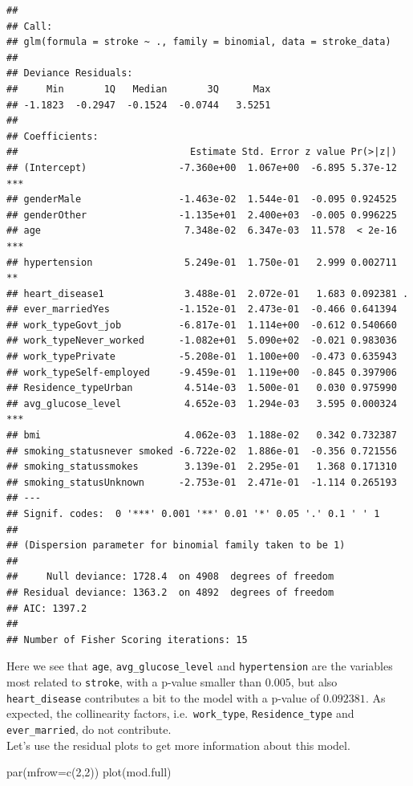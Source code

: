 \documentclass[
]{article}
\newenvironment{Shaded}{\begin{snugshade}}{\end{snugshade}}
\newcommand{\AttributeTok}[1]{\textcolor[rgb]{0.77,0.63,0.00}{#1}}
\newcommand{\DecValTok}[1]{\textcolor[rgb]{0.00,0.00,0.81}{#1}}
\newcommand{\FunctionTok}[1]{\textcolor[rgb]{0.00,0.00,0.00}{#1}}
\newcommand{\NormalTok}[1]{#1}
\begin{document}
\begin{verbatim}
## 
## Call:
## glm(formula = stroke ~ ., family = binomial, data = stroke_data)
## 
## Deviance Residuals: 
##     Min       1Q   Median       3Q      Max  
## -1.1823  -0.2947  -0.1524  -0.0744   3.5251  
## 
## Coefficients:
##                              Estimate Std. Error z value Pr(>|z|)    
## (Intercept)                -7.360e+00  1.067e+00  -6.895 5.37e-12 ***
## genderMale                 -1.463e-02  1.544e-01  -0.095 0.924525    
## genderOther                -1.135e+01  2.400e+03  -0.005 0.996225    
## age                         7.348e-02  6.347e-03  11.578  < 2e-16 ***
## hypertension                5.249e-01  1.750e-01   2.999 0.002711 ** 
## heart_disease1              3.488e-01  2.072e-01   1.683 0.092381 .  
## ever_marriedYes            -1.152e-01  2.473e-01  -0.466 0.641394    
## work_typeGovt_job          -6.817e-01  1.114e+00  -0.612 0.540660    
## work_typeNever_worked      -1.082e+01  5.090e+02  -0.021 0.983036    
## work_typePrivate           -5.208e-01  1.100e+00  -0.473 0.635943    
## work_typeSelf-employed     -9.459e-01  1.119e+00  -0.845 0.397906    
## Residence_typeUrban         4.514e-03  1.500e-01   0.030 0.975990    
## avg_glucose_level           4.652e-03  1.294e-03   3.595 0.000324 ***
## bmi                         4.062e-03  1.188e-02   0.342 0.732387    
## smoking_statusnever smoked -6.722e-02  1.886e-01  -0.356 0.721556    
## smoking_statussmokes        3.139e-01  2.295e-01   1.368 0.171310    
## smoking_statusUnknown      -2.753e-01  2.471e-01  -1.114 0.265193    
## ---
## Signif. codes:  0 '***' 0.001 '**' 0.01 '*' 0.05 '.' 0.1 ' ' 1
## 
## (Dispersion parameter for binomial family taken to be 1)
## 
##     Null deviance: 1728.4  on 4908  degrees of freedom
## Residual deviance: 1363.2  on 4892  degrees of freedom
## AIC: 1397.2
## 
## Number of Fisher Scoring iterations: 15
\end{verbatim}

Here we see that \texttt{age}, \texttt{avg\_glucose\_level} and
\texttt{hypertension} are the variables most related to \texttt{stroke},
with a p-value smaller than \(0.005\), but also \texttt{heart\_disease}
contributes a bit to the model with a p-value of \(0.092381\). As
expected, the collinearity factors, i.e.~\texttt{work\_type},
\texttt{Residence\_type} and \texttt{ever\_married}, do not
contribute.\\
Let's use the residual plots to get more information about this model.

\begin{Shaded}
\begin{Highlighting}[]
\FunctionTok{par}\NormalTok{(}\AttributeTok{mfrow=}\FunctionTok{c}\NormalTok{(}\DecValTok{2}\NormalTok{,}\DecValTok{2}\NormalTok{))}
\FunctionTok{plot}\NormalTok{(mod.full)}
\end{Highlighting}
\end{Shaded}
\end{document}
